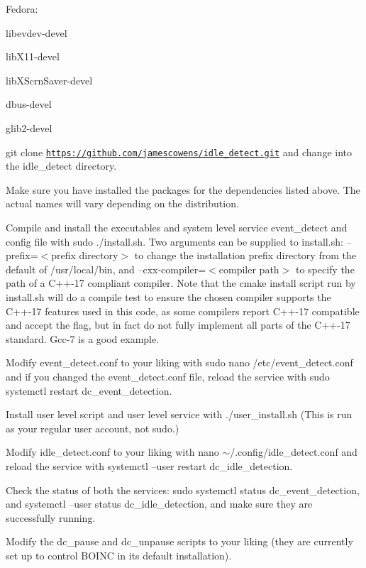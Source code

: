 Fedora\+:
\begin{DoxyItemize}
\item libevdev-\/devel
\item lib\+X11-\/devel
\item lib\+X\+Scrn\+Saver-\/devel
\item dbus-\/devel
\item glib2-\/devel
\end{DoxyItemize}

git clone \href{https://github.com/jamescowens/idle_detect.git}{\tt https\+://github.\+com/jamescowens/idle\+\_\+detect.\+git} and change into the idle\+\_\+detect directory.


\begin{DoxyEnumerate}
\item Make sure you have installed the packages for the dependencies listed above. The actual names will vary depending on the distribution.
\item Compile and install the executables and system level service event\+\_\+detect and config file with sudo ./install.sh. Two arguments can be supplied to install.\+sh\+: --prefix=$<$prefix directory$>$ to change the installation prefix directory from the default of /usr/local/bin, and --cxx-\/compiler=$<$compiler path$>$ to specify the path of a C++-\/17 compliant compiler. Note that the cmake install script run by install.\+sh will do a compile test to ensure the chosen compiler supports the C++-\/17 features used in this code, as some compilers report C++-\/17 compatible and accept the flag, but in fact do not fully implement all parts of the C++-\/17 standard. Gcc-\/7 is a good example.
\item Modify event\+\_\+detect.\+conf to your liking with sudo nano /etc/event\+\_\+detect.conf and if you changed the event\+\_\+detect.\+conf file, reload the service with sudo systemctl restart dc\+\_\+event\+\_\+detection.
\item Install user level script and user level service with ./user\+\_\+install.sh (This is run as your regular user account, not sudo.)
\item Modify idle\+\_\+detect.\+conf to your liking with nano $\sim$/.config/idle\+\_\+detect.\+conf and reload the service with systemctl --user restart dc\+\_\+idle\+\_\+detection.
\item Check the status of both the services\+: sudo systemctl status dc\+\_\+event\+\_\+detection, and systemctl --user status dc\+\_\+idle\+\_\+detection, and make sure they are successfully running.
\item Modify the dc\+\_\+pause and dc\+\_\+unpause scripts to your liking (they are currently set up to control B\+O\+I\+NC in its default installation).
\end{DoxyEnumerate}
